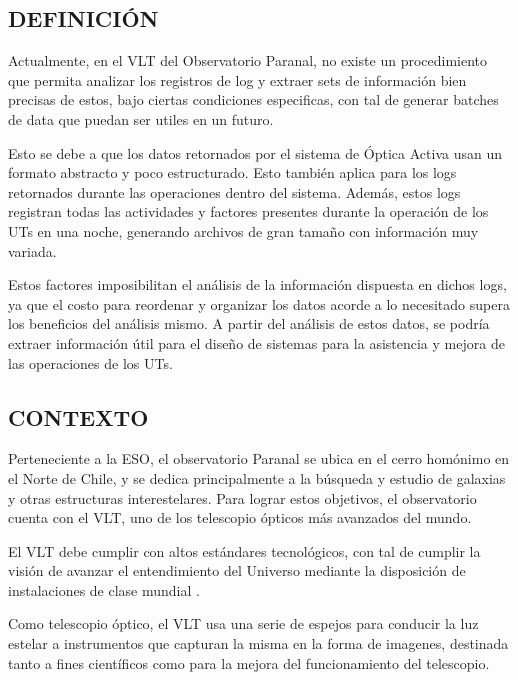 
\subsection{DEFINICIÓN}

Actualmente, en el VLT del Observatorio Paranal, no existe un procedimiento que permita analizar los registros de log y extraer sets de información bien precisas de estos, bajo ciertas condiciones especificas, con tal de generar batches de data que puedan ser utiles en un futuro. 

Esto se debe a que los datos retornados por el sistema de Óptica Activa usan un formato abstracto y poco estructurado. Esto también aplica para los logs retornados durante las operaciones dentro del sistema. Además, estos logs registran todas las actividades y factores presentes durante la operación de los UTs en una noche, generando archivos de gran tamaño con información muy variada.

Estos factores imposibilitan el análisis de la información dispuesta en dichos logs, ya que el costo para reordenar y organizar los datos acorde a lo necesitado supera los beneficios del análisis mismo. A partir del análisis de estos datos, se podría extraer información útil para el diseño de sistemas para la asistencia y mejora de las operaciones de los UTs.

\subsection{CONTEXTO}

Perteneciente a la ESO, el observatorio Paranal se ubica en el cerro homónimo en el Norte de Chile, y se dedica principalmente a la búsqueda y estudio de galaxias y otras estructuras interestelares. Para lograr estos objetivos, el observatorio cuenta con el VLT, uno de los telescopio ópticos más avanzados del mundo\cite{eso1998vlt}.

El VLT debe cumplir con altos estándares tecnológicos, con tal de cumplir la visión de avanzar el entendimiento del Universo mediante la disposición de instalaciones de clase mundial \cite{eso1998vlt}.

Como telescopio óptico, el VLT usa una serie de espejos para conducir la luz estelar a instrumentos que capturan la misma en la forma de imagenes, destinada tanto a fines científicos como para la mejora del funcionamiento del telescopio\cite{eso1998vlt}.

